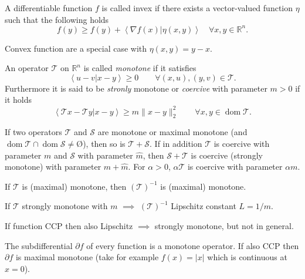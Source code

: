 \documentclass[varwidth=15cm, border=.5cm]{standalone}
\DeclareMathOperator{\domain}{dom}
\newcommand{\innerp}[2]{\left\langle #1 \vert #2 \right\rangle}
\renewcommand*{\emptyset}{\text{\O}}
\begin{document}
\begin{definition}[label=5ijd2wuq, name=Invex Functions]
	A differentiable function \(f\) is called invex if there exists a 
	vector-valued function \(\eta\) such that the following holds
	\[
		f(y) \geq f(y) + \innerp{\nabla f(x)}{\eta(x,y)} \quad \forall x,y\in\mathbb R^n.
	\]

	Convex function are a special case with \(\eta(x,y) = y-x\).
\end{definition}

\begin{definition}[label=1_xd5vw5, name=Monotone Operators and Coercivity]
	An operator \(\mathcal T\) on \(\mathbb R^n\) is called \textit{monotone} if it satisfies
	\[
		\innerp{u-v}{x-y} \geq 0\qquad\forall(x,u), (y,v)\in\mathcal T.
	\]
	Furthermore it is said to be \textit{stronly} monotone or \textit{coercive} with
	parameter \( m > 0\) if it holds
	\[
		\innerp{\mathcal T x- \mathcal T y}{x-y}\geq m\lVert x -
		y\rVert^2_2 \qquad \forall x,y\in\domain\mathcal T.
	\]

	If two operators \(\mathcal T\) and \(\mathcal S\) are monotone or maximal monotone (and 
	\(\domain\mathcal T\cap\domain\mathcal S \neq \emptyset \)), then so is \(\mathcal T + \mathcal S\). If in addition \(\mathcal T\) is coercive
	with parameter \(m\) and \(\mathcal S\) with parameter \(\hat{m}\), then \(\mathcal S + \mathcal T\) is coercive 
	(strongly monotone) with parameter \(m+\hat{m}\). For \(\alpha>0\), \(\alpha\mathcal T\) is coercive 
	with parameter \(\alpha m\).

	\begin{remark}[label=dmtwtj_m, name=Inverse Connection to Lipschitz]
		If \(\mathcal T\) is (maximal) monotone, then \((\mathcal T)^{-1}\) is (maximal) monotone.

		If \(\mathcal T\) strongly monotone with \(m\) \(\implies\) \((\mathcal T)^{-1}\) Lipschitz constant \(L=1/m\).

		If function CCP then also Lipschitz \(\implies\) strongly
		monotone, but not in general.
	\end{remark}

	\begin{remark}[label=8rp83gxt, name=Subdifferential operator]
		The subdifferential \(\partial f\) of every function is a
		monotone operator. If also CCP then \(\partial f\) is maximal
		monotone (take for example \(f(x) = |x|\) which is continuous at
		\(x = 0\)).
	\end{remark}


\end{definition}
\end{document}
